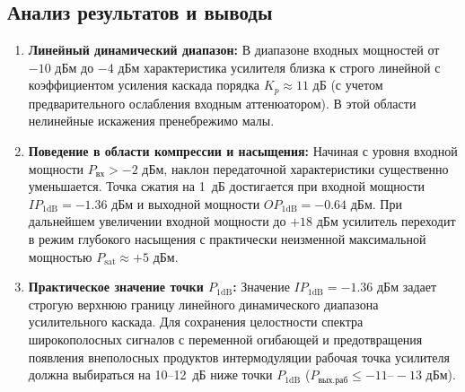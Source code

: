 \subsection{Анализ результатов и выводы}

\begin{enumerate}
    \item \textbf{Линейный динамический диапазон:} В диапазоне входных мощностей от $-10\text{ дБм}$ до $-4\text{ дБм}$ характеристика усилителя близка к строго линейной с коэффициентом усиления каскада порядка $K_p \approx 11\text{ дБ}$ (с учетом предварительного ослабления входным аттенюатором). В этой области нелинейные искажения пренебрежимо малы.
    \item \textbf{Поведение в области компрессии и насыщения:} Начиная с уровня входной мощности $P_{\text{вх}} > -2\text{ дБм}$, наклон передаточной характеристики существенно уменьшается. Точка сжатия на 1~дБ достигается при входной мощности $IP_{1\text{dB}} = -1.36\text{ дБм}$ и выходной мощности $OP_{1\text{dB}} = -0.64\text{ дБм}$. При дальнейшем увеличении входной мощности до $+18\text{ дБм}$ усилитель переходит в режим глубокого насыщения с практически неизменной максимальной мощностью $P_{\text{sat}} \approx +5\text{ дБм}$.
    \item \textbf{Практическое значение точки $P_{1\text{dB}}$:} Значение $IP_{1\text{dB}} = -1.36\text{ дБм}$ задает строгую верхнюю границу линейного динамического диапазона усилительного каскада. Для сохранения целостности спектра широкополосных сигналов с переменной огибающей и предотвращения появления внеполосных продуктов интермодуляции рабочая точка усилителя должна выбираться на 10--12~дБ ниже точки $P_{1\text{dB}}$ ($P_{\text{вых.раб}} \le -11\text{--}-13\text{ дБм}$).
\end{enumerate}